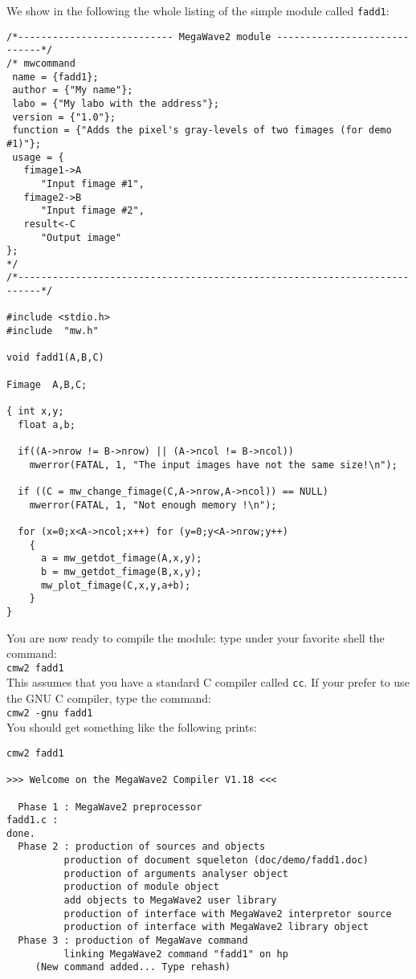 We show in the following the whole listing of the simple module called \verb+fadd1+:
{\small
\label{listing_fadd1}
\begin{verbatim}
/*--------------------------- MegaWave2 module -----------------------------*/
/* mwcommand
 name = {fadd1};
 author = {"My name"};
 labo = {"My labo with the address"};
 version = {"1.0"};
 function = {"Adds the pixel's gray-levels of two fimages (for demo #1)"};
 usage = {
   fimage1->A 
      "Input fimage #1", 
   fimage2->B
      "Input fimage #2", 
   result<-C
      "Output image"
};
*/
/*--------------------------------------------------------------------------*/

#include <stdio.h>
#include  "mw.h"

void fadd1(A,B,C)

Fimage  A,B,C;

{ int x,y;
  float a,b;

  if((A->nrow != B->nrow) || (A->ncol != B->ncol))
    mwerror(FATAL, 1, "The input images have not the same size!\n");

  if ((C = mw_change_fimage(C,A->nrow,A->ncol)) == NULL)
    mwerror(FATAL, 1, "Not enough memory !\n");  

  for (x=0;x<A->ncol;x++) for (y=0;y<A->nrow;y++)
    {
      a = mw_getdot_fimage(A,x,y);
      b = mw_getdot_fimage(B,x,y);
      mw_plot_fimage(C,x,y,a+b);
    }
}

\end{verbatim}
}

You are now ready to compile the module: type under your favorite shell the command: \\
\verb+cmw2 fadd1+ \\
This assumes that you have a standard C compiler called \verb+cc+.
If your prefer to use the GNU C compiler, type the command:\\
\verb+cmw2 -gnu fadd1+ \\
You should get something like the following prints:
{\small
\begin{verbatim}
cmw2 fadd1 
 
>>> Welcome on the MegaWave2 Compiler V1.18 <<<
 
  Phase 1 : MegaWave2 preprocessor
fadd1.c :
done.
  Phase 2 : production of sources and objects
          production of document squeleton (doc/demo/fadd1.doc)
          production of arguments analyser object
          production of module object
          add objects to MegaWave2 user library
          production of interface with MegaWave2 interpretor source
          production of interface with MegaWave2 library object
  Phase 3 : production of MegaWave command
          linking MegaWave2 command "fadd1" on hp
     (New command added... Type rehash)

\end{verbatim}
}

